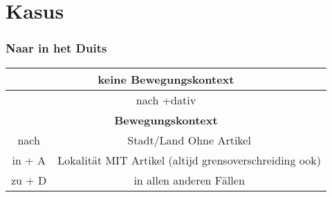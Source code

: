 \documentclass[main.tex]{subfiles}
\begin{document}
\chapter{Kasus}

\subsection{Naar in het Duits}
\begin{tabular}{| c | c | c | c |}
\hline
\multicolumn{4}{|c|}{\textbf{keine Bewegungskontext}}\\
\hline
\multicolumn{4}{|c|}{nach +dativ}\\
\hline
\hline
\multicolumn{4}{|c|}{\textbf{Bewegungskontext}}\\
\hline
nach & \multicolumn{3}{|c|}{Stadt/Land Ohne Artikel}\\
\hline
in + A & \multicolumn{3}{|c|}{Lokalität MIT Artikel (altijd grensoverschreiding ook)}\\
\hline
zu + D & \multicolumn{3}{|c|}{in allen anderen Fällen}\\
\hline
\end{tabular}
\end{document}

